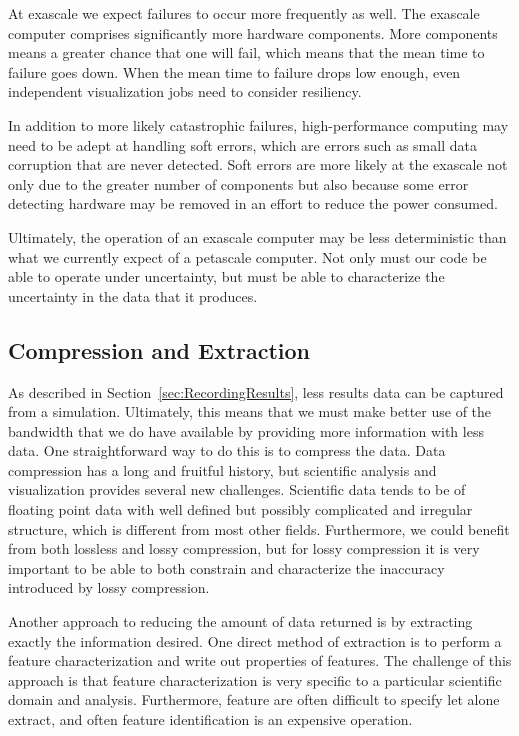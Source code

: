 \documentclass[conference]{IEEEtran}
\begin{document}
At exascale we expect failures to occur more frequently as well.  The
exascale computer comprises significantly more hardware components.  More
components means a greater chance that one will fail, which means that the
mean time to failure goes down.  When the mean time to failure drops low
enough, even independent visualization jobs need to consider resiliency.

In addition to more likely catastrophic failures, high-performance
computing may need to be adept at handling soft errors, which are errors
such as small data corruption that are never detected.  Soft errors are
more likely at the exascale not only due to the greater number of
components but also because some error detecting hardware may be removed in
an effort to reduce the power consumed.

Ultimately, the operation of an exascale computer may be less deterministic
than what we currently expect of a petascale computer.  Not only must our
code be able to operate under uncertainty, but must be able to characterize
the uncertainty in the data that it produces.

\subsection{Compression and Extraction}

\noindent
As described in Section~\ref{sec:RecordingResults}, less results data can
be captured from a simulation.  Ultimately, this means that we must make
better use of the bandwidth that we do have available by providing more
information with less data.  One straightforward way to do this is to
compress the data.  Data compression has a long and fruitful history, but
scientific analysis and visualization provides several new challenges.
Scientific data tends to be of floating point data with well defined but
possibly complicated and irregular structure, which is different from most
other fields.  Furthermore, we could benefit from both lossless and lossy
compression, but for lossy compression it is very important to be able to
both constrain and characterize the inaccuracy introduced by lossy
compression.

Another approach to reducing the amount of data returned is by extracting
exactly the information desired.  One direct method of extraction is to
perform a feature characterization and write out properties of features.
The challenge of this approach is that feature characterization is very
specific to a particular scientific domain and analysis.  Furthermore,
feature are often difficult to specify let alone extract, and often feature
identification is an expensive operation.
\end{document}
